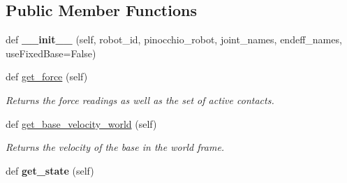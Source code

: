 \subsection*{Public Member Functions}
\begin{DoxyCompactItemize}
\item 
def {\bfseries \+\_\+\+\_\+init\+\_\+\+\_\+} (self, robot\+\_\+id, pinocchio\+\_\+robot, joint\+\_\+names, endeff\+\_\+names, use\+Fixed\+Base=False)\hypertarget{classpython_1_1py__pinocchio__bullet_1_1wrapper_1_1PinBulletWrapper_ad50c0916de58d6c8eda6dcfa81e84b9d}{}\label{classpython_1_1py__pinocchio__bullet_1_1wrapper_1_1PinBulletWrapper_ad50c0916de58d6c8eda6dcfa81e84b9d}

\item 
def \hyperlink{classpython_1_1py__pinocchio__bullet_1_1wrapper_1_1PinBulletWrapper_ab91d7c32be024c5d90bbb7af527313fb}{get\+\_\+force} (self)\hypertarget{classpython_1_1py__pinocchio__bullet_1_1wrapper_1_1PinBulletWrapper_ab91d7c32be024c5d90bbb7af527313fb}{}\label{classpython_1_1py__pinocchio__bullet_1_1wrapper_1_1PinBulletWrapper_ab91d7c32be024c5d90bbb7af527313fb}

\begin{DoxyCompactList}\small\item\em Returns the force readings as well as the set of active contacts. \end{DoxyCompactList}\item 
def \hyperlink{classpython_1_1py__pinocchio__bullet_1_1wrapper_1_1PinBulletWrapper_af3f64a253e479c47111b4cba94dfd77a}{get\+\_\+base\+\_\+velocity\+\_\+world} (self)
\begin{DoxyCompactList}\small\item\em Returns the velocity of the base in the world frame. \end{DoxyCompactList}\item 
def {\bfseries get\+\_\+state} (self)\hypertarget{classpython_1_1py__pinocchio__bullet_1_1wrapper_1_1PinBulletWrapper_a35ba3a21b8b36df34d1ad8389f4c4caa}{}\label{classpython_1_1py__pinocchio__bullet_1_1wrapper_1_1PinBulletWrapper_a35ba3a21b8b36df34d1ad8389f4c4caa}


\end{DoxyCompactItemize}
